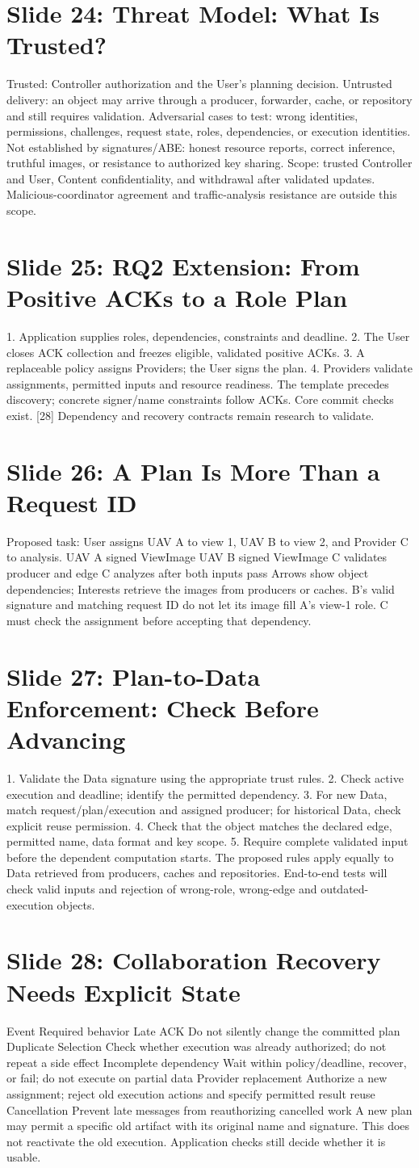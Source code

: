 \documentclass[11pt]{article}
\newcommand{\slideentry}[3]{\section*{Slide #1: #2}#3\par}
\begin{document}
\slideentry{24}{Threat Model: What Is Trusted?}{
Trusted: Controller authorization and the User’s planning decision. Untrusted delivery: an object may arrive through a producer, forwarder, cache, or repository and still requires validation. Adversarial cases to test: wrong identities, permissions, challenges, request state, roles, dependencies, or execution identities. Not established by signatures/ABE: honest resource reports, correct inference, truthful images, or resistance to authorized key sharing. Scope: trusted Controller and User, Content confidentiality, and withdrawal after validated updates. Malicious-coordinator agreement and traffic-analysis resistance are outside this scope.
}
\slideentry{25}{RQ2 Extension: From Positive ACKs to a Role Plan}{
1. Application supplies roles, dependencies, constraints and deadline. 2. The User closes ACK collection and freezes eligible, validated positive ACKs. 3. A replaceable policy assigns Providers; the User signs the plan. 4. Providers validate assignments, permitted inputs and resource readiness. The template precedes discovery; concrete signer/name constraints follow ACKs. Core commit checks exist. [28] Dependency and recovery contracts remain research to validate.
}
\slideentry{26}{A Plan Is More Than a Request ID}{
Proposed task: User assigns UAV A to view 1, UAV B to view 2, and Provider C to analysis. UAV A signed ViewImage UAV B signed ViewImage C validates producer and edge C analyzes after both inputs pass Arrows show object dependencies; Interests retrieve the images from producers or caches. B’s valid signature and matching request ID do not let its image fill A’s view-1 role. C must check the assignment before accepting that dependency.
}
\slideentry{27}{Plan-to-Data Enforcement: Check Before Advancing}{
1. Validate the Data signature using the appropriate trust rules. 2. Check active execution and deadline; identify the permitted dependency. 3. For new Data, match request/plan/execution and assigned producer; for historical Data, check explicit reuse permission. 4. Check that the object matches the declared edge, permitted name, data format and key scope. 5. Require complete validated input before the dependent computation starts. The proposed rules apply equally to Data retrieved from producers, caches and repositories. End-to-end tests will check valid inputs and rejection of wrong-role, wrong-edge and outdated-execution objects.
}
\slideentry{28}{Collaboration Recovery Needs Explicit State}{
Event Required behavior Late ACK Do not silently change the committed plan Duplicate Selection Check whether execution was already authorized; do not repeat a side effect Incomplete dependency Wait within policy/deadline, recover, or fail; do not execute on partial data Provider replacement Authorize a new assignment; reject old execution actions and specify permitted result reuse Cancellation Prevent late messages from reauthorizing cancelled work A new plan may permit a specific old artifact with its original name and signature. This does not reactivate the old execution. Application checks still decide whether it is usable.
}
\end{document}
